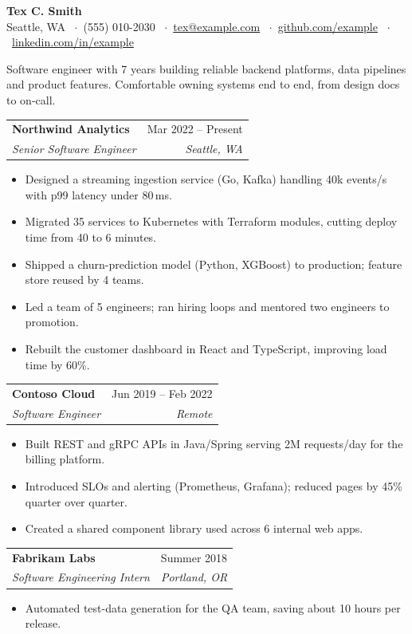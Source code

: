 \documentclass[10pt,letterpaper]{article}
\makeatletter
\newcommand{\rcSection}[1]{%
  \vspace{7pt}{\color{accent}\large\bfseries\MakeUppercase{#1}}\par
  \vspace{-5pt}{\color{accent}\rule{\linewidth}{0.6pt}}\par\vspace{1pt}}
\newcommand{\rcEntry}[4]{%
  \vspace{3pt}\begin{tabular*}{\linewidth}{@{}l@{\extracolsep{\fill}}r@{}}
    \textbf{#1} & #2 \\
    \textit{#3} & \textit{\small #4} \\
  \end{tabular*}\par}
\newcommand{\rcItemListStart}{\begin{itemize}\setlength{\itemsep}{0.5pt}\setlength{\parsep}{0pt}\setlength{\topsep}{1pt}}
\newcommand{\rcItemListEnd}{\end{itemize}\vspace{-2pt}}
\newcommand{\rcItem}[1]{\item\small #1}
\makeatother
\begin{document}
\begin{center}
  {\LARGE\bfseries Tex C. Smith}\\[3pt]
  \small Seattle, WA \ $\cdot$\ (555) 010-2030 \ $\cdot$\
  \href{mailto:tex@example.com}{tex@example.com} \ $\cdot$\
  \href{https://github.com/example}{github.com/example} \ $\cdot$\
  \href{https://linkedin.com/in/example}{linkedin.com/in/example}
\end{center}

\rcSection{Summary}
{\small Software engineer with 7 years building reliable backend platforms, data pipelines and
product features. Comfortable owning systems end to end, from design docs to on-call.}

\rcSection{Experience}
\rcEntry{Northwind Analytics}{Mar 2022 -- Present}{Senior Software Engineer}{Seattle, WA}
\rcItemListStart
  \rcItem{Designed a streaming ingestion service (Go, Kafka) handling 40k events/s with p99 latency under 80\,ms.}
  \rcItem{Migrated 35 services to Kubernetes with Terraform modules, cutting deploy time from 40 to 6 minutes.}
  \rcItem{Shipped a churn-prediction model (Python, XGBoost) to production; feature store reused by 4 teams.}
  \rcItem{Led a team of 5 engineers; ran hiring loops and mentored two engineers to promotion.}
  \rcItem{Rebuilt the customer dashboard in React and TypeScript, improving load time by 60\%.}
\rcItemListEnd
\rcEntry{Contoso Cloud}{Jun 2019 -- Feb 2022}{Software Engineer}{Remote}
\rcItemListStart
  \rcItem{Built REST and gRPC APIs in Java/Spring serving 2M requests/day for the billing platform.}
  \rcItem{Introduced SLOs and alerting (Prometheus, Grafana); reduced pages by 45\% quarter over quarter.}
  \rcItem{Created a shared component library used across 6 internal web apps.}
\rcItemListEnd
\rcEntry{Fabrikam Labs}{Summer 2018}{Software Engineering Intern}{Portland, OR}
\rcItemListStart
  \rcItem{Automated test-data generation for the QA team, saving about 10 hours per release.}
\rcItemListEnd
\end{document}
